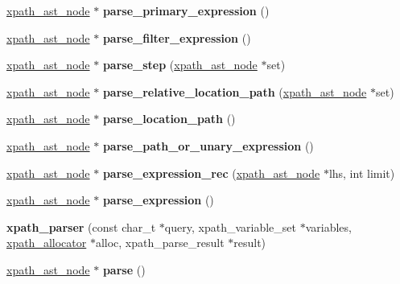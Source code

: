 \begin{DoxyCompactItemize}
\item 
\mbox{\label{structxpath__parser_a320728b83e426c4874066d633ffe65d9}} 
\hyperlink{classxpath__ast__node}{xpath\+\_\+ast\+\_\+node} $\ast$ {\bfseries parse\+\_\+primary\+\_\+expression} ()
\item 
\mbox{\label{structxpath__parser_a0530aefc1445c4eac4614e895dd0a219}} 
\hyperlink{classxpath__ast__node}{xpath\+\_\+ast\+\_\+node} $\ast$ {\bfseries parse\+\_\+filter\+\_\+expression} ()
\item 
\mbox{\label{structxpath__parser_a7daf146822e199d8ad564be25daa49db}} 
\hyperlink{classxpath__ast__node}{xpath\+\_\+ast\+\_\+node} $\ast$ {\bfseries parse\+\_\+step} (\hyperlink{classxpath__ast__node}{xpath\+\_\+ast\+\_\+node} $\ast$set)
\item 
\mbox{\label{structxpath__parser_ab50d8b75f78b7e2eb77a1cf6872daa00}} 
\hyperlink{classxpath__ast__node}{xpath\+\_\+ast\+\_\+node} $\ast$ {\bfseries parse\+\_\+relative\+\_\+location\+\_\+path} (\hyperlink{classxpath__ast__node}{xpath\+\_\+ast\+\_\+node} $\ast$set)
\item 
\mbox{\label{structxpath__parser_aae61a2931ba0b0c713b5d043f1cef6d4}} 
\hyperlink{classxpath__ast__node}{xpath\+\_\+ast\+\_\+node} $\ast$ {\bfseries parse\+\_\+location\+\_\+path} ()
\item 
\mbox{\label{structxpath__parser_a9f5cab421e931c46b0598ecec60c5591}} 
\hyperlink{classxpath__ast__node}{xpath\+\_\+ast\+\_\+node} $\ast$ {\bfseries parse\+\_\+path\+\_\+or\+\_\+unary\+\_\+expression} ()
\item 
\mbox{\label{structxpath__parser_adfd2ab26b101a03ed79d7c3041539115}} 
\hyperlink{classxpath__ast__node}{xpath\+\_\+ast\+\_\+node} $\ast$ {\bfseries parse\+\_\+expression\+\_\+rec} (\hyperlink{classxpath__ast__node}{xpath\+\_\+ast\+\_\+node} $\ast$lhs, int limit)
\item 
\mbox{\label{structxpath__parser_adb814ff3b99621d2a1c8e788ffd1c1c5}} 
\hyperlink{classxpath__ast__node}{xpath\+\_\+ast\+\_\+node} $\ast$ {\bfseries parse\+\_\+expression} ()
\item 
\mbox{\label{structxpath__parser_a3f5b4a04f4d0a0a44962d9825a86ed0d}} 
{\bfseries xpath\+\_\+parser} (const char\+\_\+t $\ast$query, xpath\+\_\+variable\+\_\+set $\ast$variables, \hyperlink{classxpath__allocator}{xpath\+\_\+allocator} $\ast$alloc, xpath\+\_\+parse\+\_\+result $\ast$result)
\item 
\mbox{\label{structxpath__parser_a581e576958037e1ab682fb952b3ada38}} 
\hyperlink{classxpath__ast__node}{xpath\+\_\+ast\+\_\+node} $\ast$ {\bfseries parse} ()
\end{DoxyCompactItemize}
